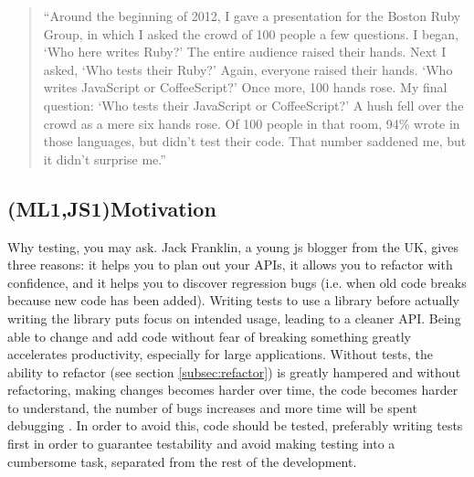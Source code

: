 \documentclass[11pt]{article}
\begin{document}
\begin{quote}
``Around the beginning of 2012, I gave a presentation for the Boston Ruby Group, in which I asked the crowd of 100 people a few questions. I began, `Who here writes Ruby?' The entire audience raised their hands. Next I asked, `Who tests their Ruby?' Again, everyone raised their hands. `Who writes JavaScript or CoffeeScript?' Once more, 100 hands rose. My final question: `Who tests their JavaScript or CoffeeScript?' A hush fell over the crowd as a mere six hands rose. Of 100 people in that room, 94\% wrote in those languages, but didn't test their code. That number saddened me, but it didn't surprise me.''
\end{quote}

\begin{center}
\end{center}

\subsection{(ML1,JS1)Motivation}
\label{subsec:motivation}

Why testing, you may ask. Jack Franklin, a young \gls{js} blogger from the UK, gives three reasons: it helps you to plan out your APIs, it allows you to refactor with confidence, and it helps you to discover regression bugs (i.e. when old code breaks because new code has been added). Writing tests to use a library before actually writing the library puts focus on intended usage, leading to a cleaner API. Being able to change and add code without fear of breaking something greatly accelerates productivity, especially for large applications. \cite{JackFranklin} Without tests, the ability to refactor (see section \ref{subsec:refactor}) is greatly hampered and without refactoring, making changes becomes harder over time, the code becomes harder to understand, the number of bugs increases and more time will be spent debugging \cite[p.~47-49]{Refactoring}. In order to avoid this, code should be tested, preferably writing tests first in order to guarantee testability and avoid making testing into a cumbersome task, separated from the rest of the development.
\end{document}
